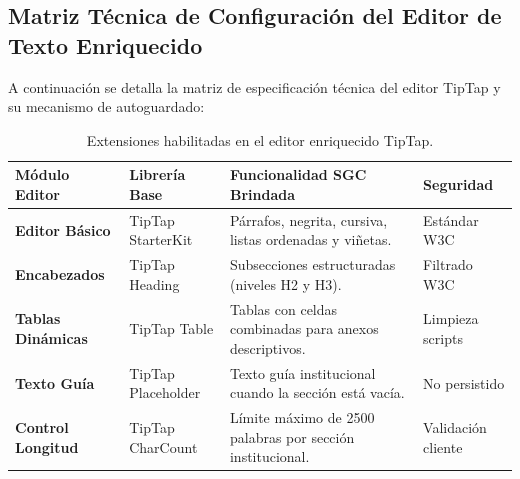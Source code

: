 \documentclass[12pt,a4paper]{article}
\begin{document}
\subsection{Matriz Técnica de Configuración del Editor de Texto Enriquecido}
A continuación se detalla la matriz de especificación técnica del editor TipTap y su mecanismo de autoguardado:
\begin{table}[H]
\centering
\small
\renewcommand{\arraystretch}{1.2}
\begin{tabularx}{\textwidth}{|>{\hsize=0.85\hsize\raggedright\arraybackslash\bfseries\footnotesize}X|>{\hsize=0.95\hsize\raggedright\arraybackslash\footnotesize}X|>{\hsize=1.4\hsize\raggedright\arraybackslash\footnotesize}X|>{\hsize=0.8\hsize\centering\arraybackslash\footnotesize}X|}
\hline
\rowcolor{tableheader}
\textbf{Módulo Editor} & \textbf{Librería Base} & \textbf{Funcionalidad SGC Brindada} & \textbf{Seguridad} \\
\hline
Editor Básico & TipTap StarterKit & Párrafos, negrita, cursiva, listas ordenadas y viñetas. & Estándar W3C \\
\hline
Encabezados & TipTap Heading & Subsecciones estructuradas (niveles H2 y H3). & Filtrado W3C \\
\hline
Tablas Dinámicas & TipTap Table & Tablas con celdas combinadas para anexos descriptivos. & Limpieza scripts \\
\hline
Texto Guía & TipTap Placeholder & Texto guía institucional cuando la sección está vacía. & No persistido \\
\hline
Control Longitud & TipTap CharCount & Límite máximo de 2500 palabras por sección institucional. & Validación cliente \\
\hline
\end{tabularx}
\caption{Extensiones habilitadas en el editor enriquecido TipTap.}
\label{tab:tiptap_extensions}
\end{table}
\end{document}
